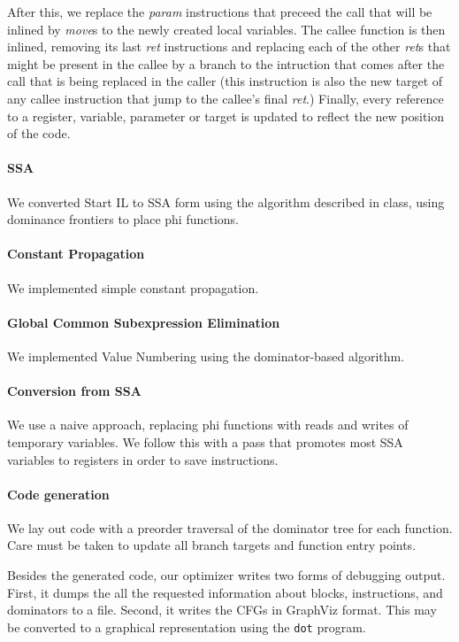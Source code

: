 \documentclass[10pt,twocolumn]{article}
\begin{document}
After this, we replace the \emph{param} instructions that preceed the call that will be inlined by \emph{move}s to the newly created local variables. The callee function is then
inlined, removing its last \emph{ret} instructions and replacing each of the other \emph{ret}s that might be present in the callee by a branch to the intruction that comes after
the call that is being replaced in the caller (this instruction is also the new target of any callee instruction that jump to the callee's final \emph{ret}.) Finally, every reference to a register, variable, parameter or target is updated to reflect the new position of the code.


\paragraph{SSA} 
We converted Start IL to SSA form using the algorithm described in
class, using dominance frontiers to place phi functions.

\paragraph{Constant Propagation} 
We implemented simple constant propagation.

\paragraph{Global Common Subexpression Elimination} 
We implemented Value Numbering using the dominator-based algorithm.

\paragraph{Conversion from SSA} 
We use a naive approach, replacing phi functions with reads and writes
of temporary variables. We follow this with a pass that promotes most
SSA variables to registers in order to save instructions.

\paragraph{Code generation} 
We lay out code with a preorder traversal of the dominator tree for
each function. Care must be taken to update all branch targets and
function entry points.


Besides the generated code, our optimizer writes two forms of
debugging output. First, it dumps the all the requested information
about blocks, instructions, and dominators to a file. Second, it
writes the CFGs in GraphViz format. This may be converted to a
graphical representation using the \texttt{dot} program.
\end{document}
